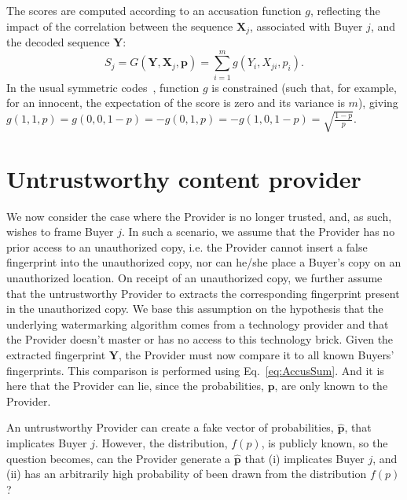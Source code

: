\documentclass{article}
\begin{document}
The scores are computed according to an accusation function $g$,
reflecting the impact of the correlation between the sequence
$\mathbf{X}_{j}$, associated with Buyer $j$, and the decoded sequence
$\mathbf{Y}$:
\begin{equation}
S_j = G(\mathbf{Y},\mathbf{X}_j,\mathbf{p}) = \sum^m_{i=1} g(Y_i,X_{ji},p_i).
\label{eq:AccusSum}
\end{equation}
In the usual symmetric codes~\cite{SkoricSymmetric}, function $g$ is
constrained (such that, for example, for an innocent, the expectation
of the score is zero and its variance is $m$), giving $g(1,1,p) =
g(0,0,1-p) = - g(0,1,p) = - g(1,0,1-p) = \sqrt{\frac{1-p}{p}}$.

\section{Untrustworthy content provider}
\label{sec:untrustworthy}

We now consider the case
where the Provider is no longer trusted, and, as such, wishes
to frame Buyer $j$.  In such a scenario, we assume that the Provider
has no prior access to an unauthorized copy, i.e. the Provider cannot
insert a false fingerprint into the unauthorized copy, nor can he/she
place a Buyer's copy on an unauthorized location.  On receipt of an
unauthorized copy, we further assume that the untrustworthy Provider
to extracts the corresponding fingerprint present in the unauthorized
copy.  We base this assumption on the hypothesis that the underlying
watermarking algorithm comes from a technology provider and that the
Provider doesn't master or has no access to this technology
brick.  Given the extracted fingerprint  $\mathbf{Y}$, the Provider must now compare
it to all known Buyers' fingerprints.  This comparison is performed
using Eq.~\eqref{eq:AccusSum}.  And it is here that the Provider can
lie, since the probabilities, $\mathbf{p}$, are only known to the
Provider.

An untrustworthy Provider can create a fake vector of probabilities,
$\hat{\mathbf{p}}$, that implicates Buyer $j$.  However, the
distribution, $f(p)$, is publicly known, so the question becomes, can
the Provider generate a $\hat{\mathbf{p}}$ that (i) implicates Buyer
$j$, and (ii) has an arbitrarily high probability of been drawn from the
distribution $f(p)$?
\end{document}
